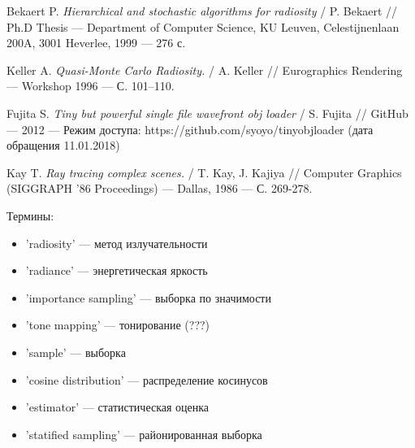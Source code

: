 \documentclass[12pt]{article}
\begin{document}
\begin{thebibliography}{9}
Bekaert P.
\textit{Hierarchical and stochastic algorithms for radiosity} /
P. Bekaert //
Ph.D Thesis --- Department of Computer Science, KU Leuven, Celestijnenlaan 200A, 3001 Heverlee, 1999 --- 276 с.

Keller  A.
\textit{Quasi-Monte Carlo Radiosity.} /
A. Keller //
Eurographics Rendering --- Workshop 1996 --- С. 101–110.

Fujita S.
\textit{Tiny but powerful single file wavefront obj loader} /
S. Fujita //
GitHub --- 2012 --- Режим доступа: https://github.com/syoyo/tinyobjloader (дата обращения 11.01.2018)

Kay T.
\textit{Ray tracing complex scenes.} /
T. Kay, J. Kajiya //
Computer Graphics (SIGGRAPH ’86 Proceedings) --- Dallas, 1986 --- С. 269-278.
\end{thebibliography}
\newpage
Термины:

\begin{itemize}
\item[] 'radiosity' --- метод излучательности
\item[] 'radiance' --- энергетическая яркость
\item[] 'importance sampling' --- выборка по значимости
\item[] 'tone mapping' --- тонирование (???)
\item[] 'sample' --- выборка
\item[] 'cosine distribution' --- распределение косинусов
\item[] 'estimator' --- статистическая оценка
\item[] 'statified sampling' --- районированная выборка
\end{itemize}
\end{document}
